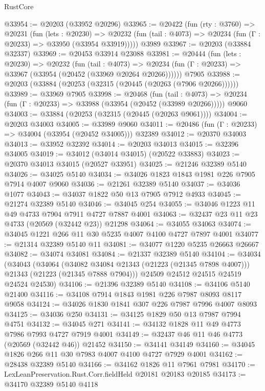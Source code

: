 \begin{lexlean}{RustCore}
\begin{coremodule}
@33954 := @20203 (@33952 @20296)
@33965 := @20422
    (fun (rty : @3760) =>
    @20231
      (fun (lets : @20230) =>
      @20232 (fun (tail : @4073) => @20234 (fun (Γ : @20233) => @33950 (@33954 @33919)))))
    @3989
@33967 := @20203 (@33884 @32337)
@33969 := @20453 @33914 @23088
@33981 := @20444
    (fun (lets : @20230) =>
    @20232
      (fun (tail : @4073) =>
      @20234 (fun (Γ : @20233) => @33967 (@33954 (@20452 (@33969 @20264 @20266))))))
    @7905
@33988 := @20203 (@33884 (@20253 (@32315 (@20445 (@20263 (@7906 @20266))))))
@33989 := @33969 @7905
@33998 := @20468
    (fun (tail : @4073) => @20234 (fun (Γ : @20233) => @33988 (@33954 (@20452 (@33989 @20266)))))
    @9060
@34003 := @33884 (@20253 (@32315 (@20445 (@20263 @9061))))
@34004 := @20203 @34003
@34005 := @33989 @9060
@34011 := @20486 (fun (Γ : @20233) => @34004 (@33954 (@20452 @34005))) @32389
@34012 := @20370 @34003
@34013 := @33952 @32392
@34014 := @20203 @34013
@34015 := @32396 @34005
@34019 := @34012 (@34014 @34015) (@20522 @33883)
@34023 := @20370 @34013 @34015 (@20527 @33951)
@34025 := @21246 @32389 @5140
@34026 := @34025 @5140
@34034 := @34026 @1823 @1843 @1981 @226 @7905 @7914 @4007 @9060
@34036 := @21261 @32389 @5140
@34037 := @34036 @1077
@34043 := @34037 @1822 @50 @13 @7905 @7912 @4933
@34045 := @21274 @32389 @5140
@34046 := @34045 @254
@34055 := @34046 @1223 @11 @49 @4733 @7904 @7911 @4727 @7887 @4001
@34063 := @32437 @23 @11 @23 @4733 (@20569 (@32442 @23)) @21298
@34064 := @34055 @34063
@34074 := @34045 @1221 @266 @11 @30 @5235 @4007 @4100 @4727 @7897 @4001
@34077 := @21314 @32389 @5140 @11
@34081 := @34077 @1220 @5235 @26663 @26667
@34082 := @34074 @34081
@34084 := @21337 @32389 @5140
@34104 := @34034
    (@34043
      (@34064
        (@34082 @34084 @21343 (@21223 (@21345 @7898 @4007)))
        @21343
        (@21223 (@21345 @7888 @7904)))
      @24509
      @24512
      @24515
      @24519
      @24524
      @24530)
@34106 := @21396 @32389 @5140
@34108 := @34106 @5140 @21400
@34116 := @34108 @7914 @1843 @1981 @226 @7987 @8093 @8117 @9058
@34124 := @34026 @1830 @1841 @307 @226 @7987 @7996 @4007 @8093
@34125 := @34036 @250
@34131 := @34125 @1829 @50 @13 @7987 @7994 @4751
@34132 := @34045 @271
@34141 := @34132 @1828 @11 @49 @4773 @7986 @7993 @4727 @7919 @4001
@34149 := @32437 @46 @11 @46 @4773 (@20569 (@32442 @46)) @21452
@34150 := @34141 @34149
@34160 := @34045 @1826 @266 @11 @30 @7983 @4007 @4100 @4727 @7929 @4001
@34162 := @28438 @32389 @5140
@34166 := @34162 @1826 @11 @7961 @7981
@34170 := LexLeanPreservation.Rust.Corr.fieldHeld @20181 @20183 @20185
@34173 := @34170 @32389 @5140 @4118

\end{coremodule}
\end{lexlean}
